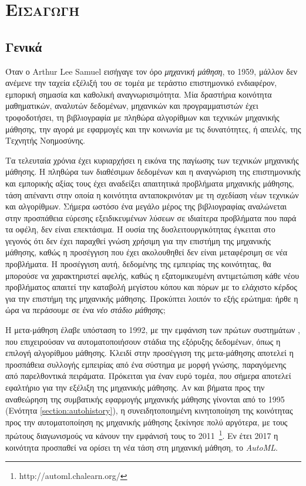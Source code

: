 \chapter{\scshape{Εισαγωγή}}
\section{Γενικά}
Όταν ο Arthur Lee Samuel εισήγαγε τον όρο \textit{μηχανική μάθηση}, το 1959, μάλλον δεν ανέμενε την ταχεία εξέλιξή του σε τομέα με τεράστιο επιστημονικό ενδιαφέρον, εμπορική σημασία και καθολική αναγνωρισιμότητα. Μία δραστήρια κοινότητα μαθηματικών, αναλυτών δεδομένων, μηχανικών και προγραμματιστών έχει τροφοδοτήσει, τη βιβλιογραφία με πληθώρα αλγορίθμων και τεχνικών μηχανικής μάθησης, την αγορά με εφαρμογές και την κοινωνία με τις δυνατότητες, ή απειλές, της Τεχνητής Νοημοσύνης.

Τα τελευταία χρόνια έχει κυριαρχήσει η εικόνα της παγίωσης των τεχνικών μηχανικής μάθησης. Η πληθώρα των διαθέσιμων δεδομένων και η αναγνώριση της επιστημονικής και εμπορικής αξίας τους έχει αναδείξει απαιτητικά προβλήματα μηχανικής μάθησης, τάση απέναντι στην οποία η κοινότητα ανταποκρινόταν με τη σχεδίαση νέων τεχνικών και αλγορίθμων. Σήμερα ωστόσο ένα μεγάλο μέρος της βιβλιογραφίας αναλώνεται στην προσπάθεια εύρεσης εξειδικευμένων λύσεων σε ιδιαίτερα προβλήματα που παρά τα οφέλη, δεν είναι επεκτάσιμα. Η ουσία της δυσλειτουργικότητας έγκειται στο γεγονός ότι δεν έχει παραχθεί γνώση χρήσιμη για την επιστήμη της μηχανικής μάθησης, καθώς η προσέγγιση που έχει ακολουθηθεί δεν είναι μεταφέρσιμη σε νέα προβλήματα. Η προσέγγιση αυτή, δεδομένης της εμπειρίας της κοινότητας, θα μπορούσε να χαρακτηριστεί αφελής, καθώς η εξατομικευμένη αντιμετώπιση κάθε νέου προβλήματος απαιτεί την καταβολή μεγίστου κόπου και πόρων με το ελάχιστο κέρδος για την επιστήμη της μηχανικής μάθησης. Προκύπτει λοιπόν το εξής ερώτημα: ήρθε η ώρα να περάσουμε σε ένα \textit{νέο στάδιο μάθησης};

Η μετα-μάθηση έλαβε υπόσταση το 1992, με την εμφάνιση των πρώτων συστημάτων \citet{craw1993,Brazdil1994}, που επιχειρούσαν να αυτοματοποιήσουν στάδια της εξόρυξης δεδομένων, όπως η επιλογή αλγορίθμου μάθησης. Κλειδί στην προσέγγιση της μετα-μάθησης αποτελεί η προσπάθεια συλλογής εμπειρίας από ένα σύστημα με μορφή γνώσης, παραγόμενης από παρελθοντικά πειράματα. Πρόκειται για έναν ευρύ τομέα, που σήμερα αποτελεί εφαλτήριο για την εξέλιξη της μηχανικής μάθησης. Αν και βήματα προς την αναθεώρηση της συμβατικής εφαρμογής μηχανικής μάθησης γίνονται από το 1995 (Ενότητα \ref{section:autohistory}), η συνειδητοποιημένη κινητοποίηση της κοινότητας προς την αυτοματοποίηση ης μηχανικής μάθησης ξεκίνησε πολύ αργότερα, με τους πρώτους διαγωνισμούς να κάνουν την εμφάνισή τους το 2011~\footnote{http://automl.chalearn.org/}. Εν έτει 2017 η κοινότητα προσπαθεί να ορίσει τη νέα τάση στη μηχανική μάθηση, το \textit{AutoML}.


